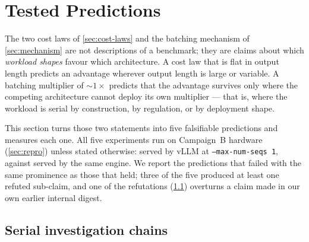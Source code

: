 %
\section{Tested Predictions}
\label{sec:applications}

The two cost laws of \cref{sec:cost-laws} and the batching mechanism of
\cref{sec:mechanism} are not descriptions of a benchmark; they are claims about
which \emph{workload shapes} favour which architecture. A cost law that is flat
in output length predicts an advantage wherever output length is large or
variable. A batching multiplier of ${\sim}1\times$ predicts that the advantage
survives only where the competing architecture cannot deploy its own multiplier
--- that is, where the workload is serial by construction, by regulation, or by
deployment shape.

This section turns those two statements into five falsifiable predictions and
measures each one. All five experiments run on Campaign~B hardware
(\cref{sec:repro}) unless stated otherwise: \modelDG{} served by vLLM at
\texttt{--max-num-seqs 1}, against \modelARthree{} served by the same engine.
We report the predictions that failed with the same prominence as those that
held; three of the five produced at least one refuted sub-claim, and one of the
refutations (\cref{sec:app-chains}) overturns a claim made in our own earlier
internal digest.

\subsection{Serial investigation chains}
\label{sec:app-chains}

